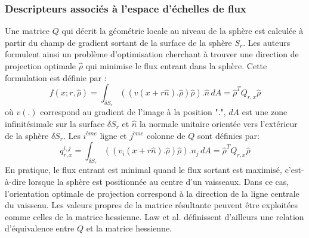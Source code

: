 \subsubsection{Descripteurs associés à l'espace d'échelles de flux}
  Une matrice $Q$ qui décrit la géométrie locale au niveau de la sphère est calculée à partir du champ de gradient sortant de la surface de la sphère $S_r$. Les auteurs formulent ainsi un problème d'optimisation cherchant à trouver une direction de projection optimale  $\widehat{\rho}$ qui minimise le flux entrant dans la sphère. Cette formulation est définie par :
\begin{equation}
    f(x;r, \widehat{\rho} )= \int_{\delta S_r} (( v(x + r\widehat{n}).\widehat{\rho})\widehat{\rho}). \widehat{n}\,dA = \widehat{\rho}^{T}Q_{r,x}\widehat{\rho}  	\nonumber
\end{equation}
où $v(.)$ correspond au gradient de l'image à la position ".", $dA$ est une zone infinitésimale sur la surface $\delta S_r$ et $\widehat{n}$ la normale unitaire orientée vers l'extérieur de la sphère $\delta S_r$.
Les $i^{ème}$ ligne et $j^{ème}$ colonne de $Q$ sont définies par: 
\begin{equation}
    q_{r,x}^{i,j} = \int_{\delta S_r} (( v_i(x + r\widehat{n}).\widehat{\rho})\widehat{\rho}).n_j\,dA = \widehat{\rho}^{T}Q_{r,x}\widehat{\rho}  \nonumber	
\end{equation}
En pratique, le flux entrant est minimal quand le flux sortant est maximisé, c'est-à-dire lorsque la sphère est positionnée au centre d'un vaisseaux. Dans ce cas, l'orientation optimale de projection correspond à la direction de la ligne centrale du vaisseau. Les valeurs propres de la matrice résultante peuvent être exploitées comme celles de la matrice hessienne. Law et al. \cite{Law2008_OOF} définissent d'ailleurs une relation d'équivalence entre $Q$ et la matrice hessienne.
